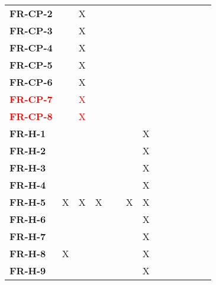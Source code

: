 \documentclass[12pt, titlepage]{article}
\begin{document}
\begin{table}[H]
\begin{adjustbox}{max width=0.7\paperwidth}
\begin{tabular}{l|ccccccccccc}
        \textbf{FR-CP-2}   & ~ & X & ~ & ~ & ~ & ~ & ~ & ~\\
        \textbf{FR-CP-3}   & ~ & X & ~ & ~ & ~ & ~ & ~ & ~\\
        \textbf{FR-CP-4}   & ~ & X & ~ & ~ & ~ & ~ & ~ & ~\\
        \textbf{FR-CP-5}   & ~ & X & ~ & ~ & ~ & ~ & ~ & ~\\
        \textbf{FR-CP-6}   & ~ & X & ~ & ~ & ~ & ~ & ~ & ~\\
        \textcolor{red}{\textbf{FR-CP-7}}   & ~ & \textcolor{red}{X} & ~ & ~ & ~ & ~ & ~ & ~\\
        \textcolor{red}{\textbf{FR-CP-8}}   & ~ & \textcolor{red}{X} & ~ & ~ & ~ & ~ & ~ & ~\\
        \textbf{FR-H-1}    & ~ & ~ & ~ & ~ & ~ & X & ~ & ~\\
        \textbf{FR-H-2}    & ~ & ~ & ~ & ~ & ~ & X & ~ & ~\\
        \textbf{FR-H-3}    & ~ & ~ & ~ & ~ & ~ & X & ~ & ~\\
        \textbf{FR-H-4}    & ~ & ~ & ~ & ~ & ~ & X & ~ & ~\\
        \textbf{FR-H-5}    & X & X & X & ~ & X & X & ~ & ~\\
        \textbf{FR-H-6}    & ~ & ~ & ~ & ~ & ~ & X & ~ & ~\\
        \textbf{FR-H-7}    & ~ & ~ & ~ & ~ & ~ & X & ~ & ~\\
        \textbf{FR-H-8}    & X & ~ & ~ & ~ & ~ & X & ~ & ~\\
        \textbf{FR-H-9}    & ~ & ~ & ~ & ~ & ~ & X & ~ & ~\\
    \end{tabular}
    \end{adjustbox}
    \label{Traceability Matrix: Functional Requirement}
\end{table}
\end{document}

